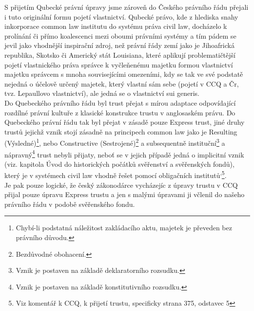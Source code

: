 \documentclass{article}
\begin{document}
S přijetím Qubecké právní úpravy jsme zároveň do Českého právního řádu přejali i tuto originální formu pojetí vlastnictví. Qubecké právo, kde z hlediska snahy inkorporace common law institutu do systému práva civil law, docházelo k prolínání či přímo koalescenci mezi oboumi právními systémy a tím pádem se jevil jako vhodnější inspirační zdroj, než právní řády zemí jako je Jihoafrická republika, Skotsko či Americký stát Louisiana, které aplikují problematičtější pojetí vlastnického práva správce k vyčleňenému majetku formou vlastnictví majetku správcem s mnoha souvisejícími omezeními, kdy se tak ve své podstatě nejedná o účelově určený majetek, který vlastní sám sebe (pojetí v CCQ a Čr, tvz. Lepaullovo vlastnictví), ale jedná se o vlastnictví sui generis.\\


Do Quebeckého právního řádu byl trust přejat s mírou adaptace odpovídající rozdílné právní kultuře z klasické konstrukce trustu v anglosaském právu. Do Quebeckého právní řádu tak byl přejat v zásadě pouze Express trust, jiné druhy trustů jejichž vznik stojí zásadně na principech common law jako je Resulting (Výsledné)\footnote{Chybí-li podstatná náležitost zakládacího aktu, majetek je převeden bez právního důvodu.}, nebo Constructive (Sestrojené)\footnote{Bezdůvodné obohacení.} a subsequentně instituční\footnote{Vznik je postaven na základě deklaratorního rozsudku.} a nápravný\footnote{Vznik je postaven na základě konstitutivního rozsudku.} trust nebyli přijaty, neboť se v jejich případě jedná o implicitní vznik (viz. kapitola Úvod do historických počátků svěřenství a svěřenských fondů), který je v systémech civil law vhodně řešet pomocí obligačních institutů\textsuperscript{,}\footnote{Viz komentář k CCQ, k přijetí trustu, specificky strana 375, odstavec 5}.\\

Je pak pouze logické, že český zákonodárce vycházejíc z úpravy trustu v CCQ přijal pouze úpravu Express trustu a jen s malými úpravami ji včlenil do našeho právního řádu v podobě svěřenského fondu.
\end{document}
